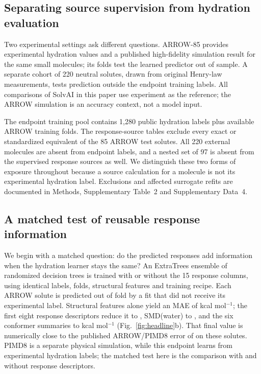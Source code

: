 \documentclass[12pt]{article}
\begin{document}
\subsection*{Separating source supervision from hydration evaluation}

Two experimental settings ask different questions. ARROW-85 provides experimental
hydration values and a published high-fidelity simulation result for the same
small molecules; its folds test the learned predictor out of sample. A separate
cohort of 220 neutral solutes, drawn from original Henry-law measurements, tests
prediction outside the endpoint training labels. All comparisons of SolvAI in
this paper use experiment as the reference; the ARROW simulation is an accuracy
context, not a model input.

The endpoint training pool contains 1,280 public hydration labels plus available
ARROW training folds. The response-source tables exclude every exact or standardized
equivalent of the 85 ARROW test solutes. All 220 external molecules are absent from
endpoint labels, and a nested set of 97 is absent from the supervised response
sources as well. We distinguish these two forms of exposure throughout because a
source calculation for a molecule is not its experimental hydration label.
Exclusions and affected surrogate refits are documented in Methods, Supplementary
Table~2 and Supplementary Data~4.

\subsection*{A matched test of reusable response information}



We begin with a matched question: do the predicted responses add information
when the hydration learner stays the same? An ExtraTrees ensemble of randomized
decision trees\cite{extratrees2006} is trained with or without the 15 response
columns, using identical labels, folds, structural features and training recipe.
Each ARROW solute is predicted out of fold by a fit that did not receive its
experimental label. Structural features alone yield an MAE of \MatchedMAE{}
kcal mol$^{-1}$; the first eight response descriptors reduce it to \NarrowMAE{},
SMD(water) to \NarrowSMDMAE{}, and the six conformer summaries to
\SolvAIMAE{} kcal mol$^{-1}$ (Fig.~\ref{fig:headline}b). That final value is
numerically close to the published ARROW/PIMD8 error of \PIMDMAE{} on these
solutes. PIMD8 is a separate physical simulation, while this endpoint learns
from experimental hydration labels; the matched test here is the comparison
with and without response descriptors.
\end{document}

